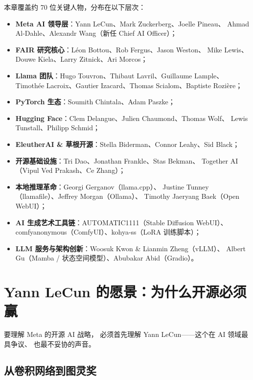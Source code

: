 \begin{corebox}[本章人物图谱]
本章覆盖约 70 位关键人物，分布在以下层次：
\begin{itemize}
  \item \textbf{Meta AI 领导层}：Yann LeCun、Mark Zuckerberg、Joelle Pineau、
    Ahmad Al-Dahle、Alexandr Wang（新任 Chief AI Officer）；
  \item \textbf{FAIR 研究核心}：L\'eon Bottou、Rob Fergus、Jason Weston、
    Mike Lewis、Douwe Kiela、Larry Zitnick、Ari Morcos；
  \item \textbf{Llama 团队}：Hugo Touvron、Thibaut Lavril、Guillaume Lample、
    Timoth\'ee Lacroix、Gautier Izacard、Thomas Scialom、Baptiste Rozi\`ere；
  \item \textbf{PyTorch 生态}：Soumith Chintala、Adam Paszke；
  \item \textbf{Hugging Face}：Clem Delangue、Julien Chaumond、Thomas Wolf、
    Lewis Tunstall、Philipp Schmid；
  \item \textbf{EleutherAI \& 草根开源}：Stella Biderman、Connor Leahy、Sid Black；
  \item \textbf{开源基础设施}：Tri Dao、Jonathan Frankle、Stas Bekman、
    Together AI（Vipul Ved Prakash、Ce Zhang）；
  \item \textbf{本地推理革命}：Georgi Gerganov（llama.cpp）、
    Justine Tunney（llamafile）、Jeffrey Morgan（Ollama）、
    Timothy Jaeryang Baek（Open WebUI）；
  \item \textbf{AI 生成艺术工具链}：AUTOMATIC1111（Stable Diffusion WebUI）、
    comfyanonymous（ComfyUI）、kohya-ss（LoRA 训练脚本）；
  \item \textbf{LLM 服务与架构创新}：Woosuk Kwon \& Lianmin Zheng（vLLM）、
    Albert Gu（Mamba / 状态空间模型）、Abubakar Abid（Gradio）。
\end{itemize}
\end{corebox}


\section{Yann LeCun 的愿景：为什么开源必须赢}
\label{sec:lecun-vision}

要理解 Meta 的开源 AI 战略，
必须首先理解 Yann LeCun——这个在 AI 领域最具争议、
也最不妥协的声音。

\subsection{从卷积网络到图灵奖}

